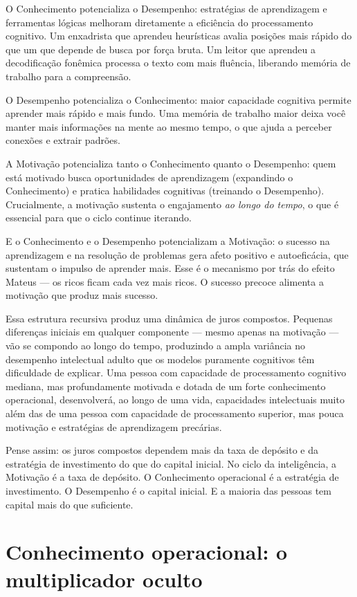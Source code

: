 \documentclass[11pt, twoside, openright]{book}
\begin{document}
O Conhecimento potencializa o Desempenho: estratégias de aprendizagem e ferramentas lógicas melhoram diretamente a eficiência do processamento cognitivo. Um enxadrista que aprendeu heurísticas avalia posições mais rápido do que um que depende de busca por força bruta. Um leitor que aprendeu a decodificação fonêmica processa o texto com mais fluência, liberando memória de trabalho para a compreensão.

O Desempenho potencializa o Conhecimento: maior capacidade cognitiva permite aprender mais rápido e mais fundo. Uma memória de trabalho maior deixa você manter mais informações na mente ao mesmo tempo, o que ajuda a perceber conexões e extrair padrões.

A Motivação potencializa tanto o Conhecimento quanto o Desempenho: quem está motivado busca oportunidades de aprendizagem (expandindo o Conhecimento) e pratica habilidades cognitivas (treinando o Desempenho). Crucialmente, a motivação sustenta o engajamento \textit{ao longo do tempo}, o que é essencial para que o ciclo continue iterando.

E o Conhecimento e o Desempenho potencializam a Motivação: o sucesso na aprendizagem e na resolução de problemas gera afeto positivo e autoeficácia, que sustentam o impulso de aprender mais. Esse é o mecanismo por trás do efeito Mateus --- os ricos ficam cada vez mais ricos. O sucesso precoce alimenta a motivação que produz mais sucesso.

Essa estrutura recursiva produz uma dinâmica de juros compostos. Pequenas diferenças iniciais em qualquer componente --- mesmo apenas na motivação --- vão se compondo ao longo do tempo, produzindo a ampla variância no desempenho intelectual adulto que os modelos puramente cognitivos têm dificuldade de explicar. Uma pessoa com capacidade de processamento cognitivo mediana, mas profundamente motivada e dotada de um forte conhecimento operacional, desenvolverá, ao longo de uma vida, capacidades intelectuais muito além das de uma pessoa com capacidade de processamento superior, mas pouca motivação e estratégias de aprendizagem precárias.

Pense assim: os juros compostos dependem mais da taxa de depósito e da estratégia de investimento do que do capital inicial. No ciclo da inteligência, a Motivação é a taxa de depósito. O Conhecimento operacional é a estratégia de investimento. O Desempenho é o capital inicial. E a maioria das pessoas tem capital mais do que suficiente.

\section*{Conhecimento operacional: o multiplicador oculto}
\end{document}
